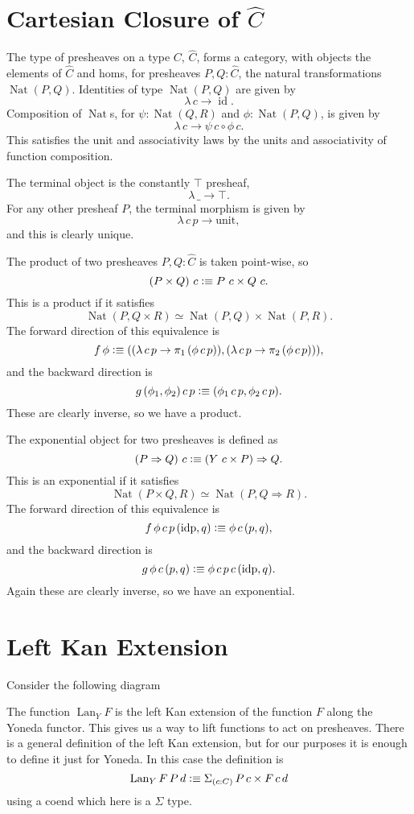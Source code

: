 \documentclass[12pt, parskip, DIV=14]{scrbook}
\newcommand{\defeq}{\vcentcolon\equiv}
\renewcommand{\circ}{\vysmwhtcircle}
\newcommand{\Nat}{\operatorname{Nat}}
\newcommand{\idp}{\operatorname{idp}}
\newcommand{\Lan}{\operatorname{Lan}}
\newcommand{\id}{\operatorname{id}}
\begin{document}
\section{Cartesian Closure of $\widehat{C}$}

The type of presheaves on a type $C$, $\widehat{C}$, forms a category, with objects the elements of $\widehat{C}$ and homs, for presheaves $P, Q : \widehat{C}$, the natural transformations $\Nat(P,Q)$. Identities of type $\Nat(P,Q)$ are given by
$$\lambda\,c \to \id.$$
Composition of $\Nat$s, for $\psi : \Nat(Q,R)$ and $\phi : \Nat(P,Q)$, is given by
$$\lambda\,c \to \psi\,c \circ \phi\,c.$$
This satisfies the unit and associativity laws by the units and associativity of function composition.

The terminal object is the constantly $\top$ presheaf,
$$\lambda\,\_ \to \top.$$
For any other presheaf $P$, the terminal morphism is given by
$$\lambda\,c\,p \to \mathrm{unit},$$
and this is clearly unique.

The product of two presheaves $P , Q : \widehat{C}$ is taken point-wise, so $$(P \times Q)~c \defeq P~c \times Q~c.$$ This is a product if it satisfies
$$\Nat(P,Q \times R) \simeq \Nat(P,Q) \times \Nat(P,R).$$ The forward direction of this equivalence is
$$f\,\phi \defeq ((\lambda\,c\,p \to \pi_1\,(\phi\,c\,p)) , (\lambda\,c\,p \to \pi_2\,(\phi\,c\,p))),$$
and the backward direction is
$$g\,(\phi_1 , \phi_2)\,c\,p \defeq (\phi_1\,c\,p , \phi_2\,c\,p).$$
These are clearly inverse, so we have a product.

The exponential object for two presheaves is defined as $$(P \Rightarrow Q)~c \defeq (Y~c \times P) \Rightarrow Q.$$ This is an exponential if it satisfies
$$\Nat(P \times Q,R) \simeq \Nat(P,Q \Rightarrow R).$$
The forward direction of this equivalence is
$$f\,\phi\,c\,p\,(\idp , q) \defeq \phi\,c\,(p , q),$$
and the backward direction is
$$g\,\phi\,c\,(p , q) \defeq \phi\,c\,p\,c\,(\idp , q).$$
Again these are clearly inverse, so we have an exponential.

\section{Left Kan Extension}
\label{sec:lans}


Consider the following diagram
\begin{center}
\end{center}
The function $\Lan_Y F$ is the left Kan extension of the function $F$ along the Yoneda functor. This gives us a way to lift functions to act on presheaves. There is a general definition of the left Kan extension, but for our purposes it is enough to define it just for Yoneda. In this case the definition is
$$\Lan_Y F\,P\,d \defeq \Sigma_{(c : C)}\,P\,c \times F\,c\,d$$
using a coend which here is a $\Sigma$ type.
\end{document}
